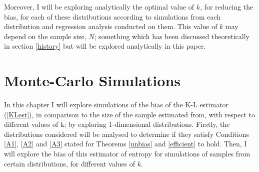 \documentclass[12pt]{report}
\begin{document}
Moreover, I will be exploring analytically the optimal value of $k$, for reducing the bias, for each of these distributions according to simulations from each distribution and regression analysis conducted on them. This value of $k$ may depend on the sample size, $N$; something which has been discussed theoretically in section \ref{history} but will be explored analytically in this paper.











\chapter{Monte-Carlo Simulations} \label{Chapter_simulations}

In this chapter I will explore simulations of the bias of the K-L estimator (\ref{KLest}), in comparison to the size of the sample estimated from, with respect to different values of k; by exploring 1-dimensional distributions. Firstly, the distributions considered will be analysed to determine if they satisfy Conditions \ref{A1}, \ref{A2} and \ref{A3} stated for Theorems \ref{unbias} and \ref{efficient} to hold. Then, I will explore the bias of this estimator of entropy for simulations of samples from certain distributions, for different values of $k$.
\end{document}
